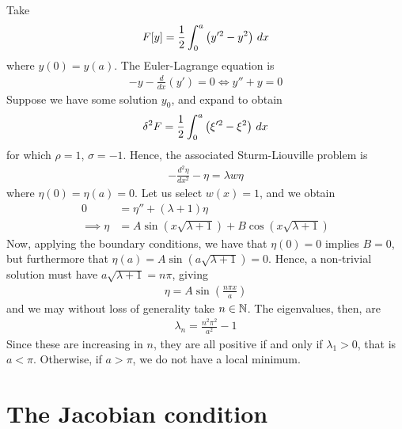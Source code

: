 \documentclass{../template/note}
\begin{document}
    \begin{example*}
        Take
        \begin{align*}
            F[y] = \frac 1 2 \int_0^a \left(y'^2-y^2\right) \,d{x}
        \end{align*}
        where $y(0) = y(a)$. The Euler-Lagrange equation is
        \begin{align*}
            -y-\frac{d}{dx}(y') = 0 \iff y'' + y = 0
        \end{align*}
        Suppose we have some solution $y_0$, and expand to obtain
        \begin{align*}
            \delta^2 F = \frac 1 2 \int_0^a \left(\xi'^2 - \xi^2\right) \,d{x}
        \end{align*}
        for which $\rho = 1$, $\sigma = -1$. Hence, the associated Sturm-Liouville problem is
        \begin{align*}
            -\frac{d^2\eta}{dx^2}-\eta = \lambda w \eta
        \end{align*}
        where $\eta(0) = \eta(a) = 0$. Let us select $w(x) = 1$, and we obtain
        \begin{align*}
            0 &= \eta'' + (\lambda+1)\eta \\
            \implies \eta &= A \sin\left(x\sqrt{\lambda+1}\right) + B\cos\left(x\sqrt{\lambda+1}\right)
        \end{align*}
        Now, applying the boundary conditions, we have that $\eta(0) = 0$ implies $B=0$, but furthermore that $\eta(a) = A \sin\left(a\sqrt{\lambda+1}\right) = 0$. Hence, a non-trivial solution must have $a\sqrt{\lambda+1} = n\pi$, giving
        \begin{align*}
            \eta = A \sin \left(\frac{n\pi x}{a}\right)
        \end{align*}
        and we may without loss of generality take $n \in \mathbb N$. The eigenvalues, then, are
        \begin{align*}
            \lambda_n = \frac{n^2\pi^2}{a^2}-1
        \end{align*}
        Since these are increasing in $n$, they are all positive if and only if $\lambda_1 > 0$, that is $a < \pi$. Otherwise, if $a > \pi$, we do not have a local minimum.
    \end{example*}
    
    \section{The Jacobian condition}
\end{document}
